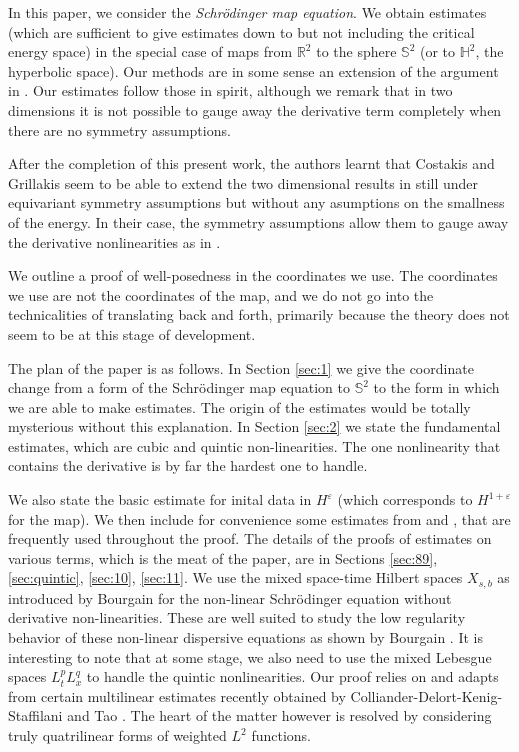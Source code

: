 \documentclass[draft,11pt,leqno]{amsart}
\newcommand{\ve}{\varepsilon}
\newcommand{\rtwo}{\mathbb R^2}
\newcommand{\stwo}{\mathbb S^2}
\begin{document}
\vspace{ .1cm}

In this paper, we consider the {\it Schr\"odinger map equation}. We
obtain estimates (which are sufficient to give estimates  down to but 
not including the critical energy  space)  in the special case of maps
from  $\rtwo$ to the sphere $\stwo$ (or to 
${\mathbb H^2}$, the hyperbolic space).
Our methods are in some sense an extension of the argument in 
\cite{Chang}. Our estimates follow those in spirit, although we remark
that in two 
dimensions it is not possible to gauge away the derivative term
completely when there are no symmetry assumptions. 

After the completion of this present work, the authors learnt 
that Costakis and Grillakis \cite{Grillakis} seem to be 
able to extend the two dimensional results in \cite{Chang} 
still under equivariant symmetry assumptions but without any
asumptions on the smallness of the energy. In their case, 
the symmetry assumptions allow them to gauge away the
derivative nonlinearities as in \cite{Chang}. 


\vspace{.1cm} 


We outline a proof of well-posedness in the 
coordinates we use.   The coordinates we use are not the coordinates 
of the map,  and we do not go into the technicalities of translating 
back and forth, primarily because the theory does not seem to be at 
this stage of development.

The plan of the paper is as follows. In Section \ref{sec:1} we give the 
coordinate change from a form of the Schr\"odinger map equation  to 
$\stwo$  to the form in which we are 
able to make estimates. The origin of the estimates would be totally 
mysterious without this explanation.  In Section \ref{sec:2} we state the 
fundamental estimates, which are  cubic and quintic non-linearities. The 
one nonlinearity that contains the derivative is by far the hardest one 
to handle. 

We also state the basic estimate  for inital data in 
$H^{\ve}$ (which  corresponds to $H^{1+ \ve}$ for the map). We then
include for convenience some estimates from \cite{Kenig} and \cite{Tao},
that are frequently used throughout the proof. 
The details of the proofs of estimates on various terms, which is the 
meat of the paper,  are in Sections \ref{sec:89}, \ref{sec:quintic}, 
\ref{sec:10}, \ref{sec:11}.  We use the mixed  space-time Hilbert 
spaces $X_{s,b}$ as introduced by Bourgain for the non-linear 
Schr\"odinger equation without derivative non-linearities. These are well suited
to study the low regularity behavior of these non-linear dispersive 
equations as shown by Bourgain \cite{Bourgain1} \cite{Bourgain2}. It is interesting to note that at some stage, we also need to use 
the mixed Lebesgue spaces $L_t^p L_x^q$ to handle the 
quintic nonlinearities. Our proof relies on and adapts from certain 
multilinear estimates recently obtained by Colliander-Delort-Kenig-Staffilani \cite{Kenig} and Tao \cite{Tao}.  The heart of the matter however is resolved 
by considering truly quatrilinear forms of weighted $L^2$ functions. 
\end{document}
